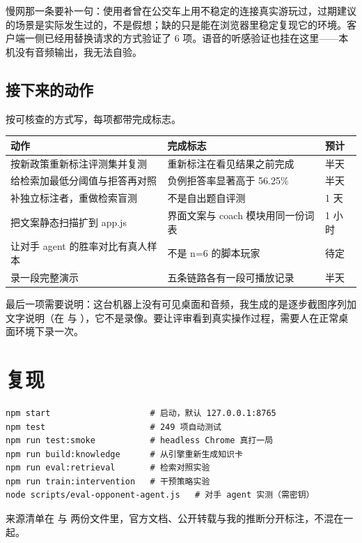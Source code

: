 慢网那一条要补一句：使用者曾在公交车上用不稳定的连接真实游玩过，过期建议的场景是实际发生过的，不是假想；缺的只是能在浏览器里稳定复现它的环境。客户端一侧已经用替换请求的方式验证了 6 项。语音的听感验证也挂在这里——本机没有音频输出，我无法自验。

\subsection{接下来的动作}

按可核查的方式写，每项都带完成标志。

\begin{table}[h]
\centering
\small
\begin{tabular}{L{6.4cm}L{5.6cm}L{1.4cm}}
\toprule
动作 & 完成标志 & 预计 \\
\midrule
按新政策重新标注评测集并复测 & 重新标注在看见结果之前完成 & 半天 \\
给检索加最低分阈值与拒答再对照 & 负例拒答率显著高于 56.25\% & 半天 \\
补独立标注者，重做检索盲测 & 不是自出题自评测 & 1 天 \\
把文案静态扫描扩到 app.js & 界面文案与 coach 模块用同一份词表 & 1 小时 \\
让对手 agent 的胜率对比有真人样本 & 不是 n=6 的脚本玩家 & 待定 \\
录一段完整演示 & 五条链路各有一段可播放记录 & 半天 \\
\bottomrule
\end{tabular}
\end{table}

最后一项需要说明：这台机器上没有可见桌面和音频，我生成的是逐步截图序列加文字说明（在  与 ），它不是录像。要让评审看到真实操作过程，需要人在正常桌面环境下录一次。

\section{复现}

\begin{verbatim}
npm start                    # 启动，默认 127.0.0.1:8765
npm test                     # 249 项自动测试
npm run test:smoke           # headless Chrome 真打一局
npm run build:knowledge      # 从引擎重新生成知识卡
npm run eval:retrieval       # 检索对照实验
npm run train:intervention   # 干预策略实验
node scripts/eval-opponent-agent.js   # 对手 agent 实测（需密钥）
\end{verbatim}

来源清单在  与  两份文件里，官方文档、公开转载与我的推断分开标注，不混在一起。
